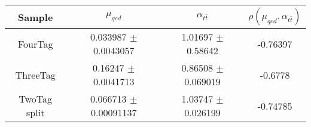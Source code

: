 \begin{footnotesize} 
\begin{tabular}{c|c|c|c} 
Sample & $\mu_{qcd}$ & $\alpha_{t\bar{t}}$ & $\rho(\mu_{qcd}, \alpha_{t\bar{t}})$ \\ 
\hline\hline 
FourTag & 0.033987 $\pm$ 0.0043057 & 1.01697 $\pm$ 0.58642 & -0.76397\\
ThreeTag & 0.16247 $\pm$ 0.0041713 & 0.86508 $\pm$ 0.069019 & -0.6778\\
TwoTag split & 0.066713 $\pm$ 0.00091137 & 1.03747 $\pm$ 0.026199 & -0.74785\\
\hline\hline 
\end{tabular} 
\end{footnotesize} 
\newline 
